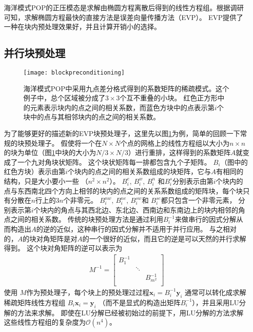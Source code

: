 海洋模式POP的正压模态是求解由椭圆方程离散后得到的线性方程组。根据调研可知，求解椭圆方程最快的直接方法是误差向量传播方法（EVP）\cite{roache1995elliptic}。 
EVP提供了一种在块内预处理效果好，并且计算开销小的选择。




\subsection{并行块预处理} 
\label{precond:EVP:Parallel}
 
\begin{figure}[!t]
\centering
\texttt{[image: blockpreconditioning]}
\caption[] {海洋模式POP中采用九点差分格式得到的系数矩阵的稀疏模式。这个例子中，总个区域被分成了$3\times3$个互不重叠的小块。
红色正方形中的元素表示块内的点之间的相关系数，而蓝色方块中的点表示第$i$个块中的点与其相邻块内的点之间的相关系数。 \label{fig:blockprecond}}
\end{figure}
 
为了能够更好的描述新的EVP块预处理子，这里先以图\ref{fig:blockprecond}为例，简单的回顾一下常规的块预处理子。 
假使将一个在$N \times N$个点的网格上的线性方程组以大小为$n\times n$的块为单位（图\ref{fig:blockprecond}中块的大小为$N/3\times N/3$）进行重排，这样得到的系数矩阵$A$就变成了一个九对角块状矩阵。
这个块状矩阵每一排都包含九个子矩阵。 
$B_i$（图中的红色方块）表示由第$i$个块内的点之间的相关系数组成的块矩阵，它与$A$有相同的结构，只是大小要小一些 （$n^2\times n^2$）。 
$B_i^e$, $B_i^w$, $B_i^n$ 和$B_i^s$分别表示由第$i$个块内的点与东西南北四个方向上相邻的块内的点之间的关系系数组成的矩阵块，每个块只有分散在$n$行上的$3n$个非零元。
$B_i^{nw}$, $B_i^{ne}$, $B_i^{sw}$和 $B_i^{se}$都只包含一个非零元素， 分别表示第$i$个块内的角点与其西北边、东北边、西南边和东南边上的块内相邻的角点之间的相关系数。 
传统的块预处理方法是通过利用$B_i^{-1}$来做串行的因式分解从而构造出$A$的逆的近似，这种串行的因式分解并不适用于并行应用。
与之相对的，$A$的块对角矩阵是对$A$的一个很好的近似，而且它的逆是可以天然的并行求解得到。
这个块对角矩阵的逆可以表示为 
\begin{eqnarray*}
M^{-1}=    \left [
        \begin{array}{ccccccc}
        B_1^{-1} &   &  \\
         & \ddots&  \\
        &   &  B_{m^2}^{-1} \\
    \end{array}
    \right ]
\end{eqnarray*}
使用 $M$作为预处理子，每个块上的预处理过过程$\textbf{x}_i
= B_i^{-1}\textbf{y}_i$ 通常可以转化成求解稀疏矩阵线性方程组 $B_i \textbf{x}_i = \textbf{y}_i$
（而不是显式的构造出矩阵$B_i^{-1}$），并且采用LU分解的方法来求解。  
即使在LU分解已经被初始过的前提下，用LU分解的方法求解这些线性方程组的复杂度为$\mathcal{O}(n^4)$\cite{golub2012matrix}。
 


